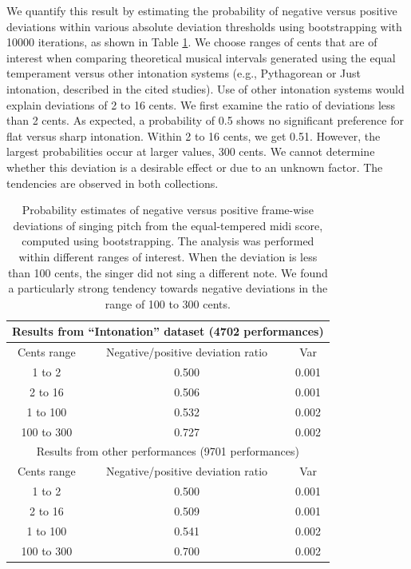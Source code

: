 We quantify this result by estimating the probability of negative versus positive deviations within various absolute deviation thresholds using bootstrapping \cite{efron1994introduction} with 10000 iterations, as shown in Table \ref{table:1}. We choose ranges of cents that are of interest when comparing theoretical musical intervals generated using the equal temperament versus other intonation systems (e.g., Pythagorean or Just intonation, described in the cited studies). Use of other intonation systems would explain deviations of 2 to 16 cents. We first examine the ratio of deviations less than 2 cents. As expected, a probability of 0.5 shows no significant preference for flat versus sharp intonation. Within 2 to 16 cents, we get 0.51. However, the largest probabilities occur at larger values, 300 cents. We cannot determine whether this deviation is a desirable effect or due to an unknown factor. The tendencies are observed in both collections. 


\begin{table}[t!]
\centering
\begin{tabular}{ |c|c|c| } 
\hline
\multicolumn{3}{|c|}{Results from ``Intonation'' dataset (4702 performances)}\\
\hline\hline
Cents range & Negative/positive deviation ratio & Var \\
\hline
1 to 2 & 0.500 & 0.001 \\ 
2 to 16 & 0.506 & 0.001 \\ 
1 to 100 & 0.532 & 0.002\\ 
100 to 300 & 0.727 & 0.002\\ 
\hline\hline
\multicolumn{3}{|c|}{Results from other performances (9701 performances)}\\
\hline\hline
Cents range & Negative/positive deviation ratio & Var \\
\hline
1 to 2 & 0.500 & 0.001 \\ 
2 to 16 & 0.509 & 0.001 \\ 
1 to 100 & 0.541 & 0.002\\ 
100 to 300 & 0.700 & 0.002\\ 
\hline
\end{tabular}
\caption{Probability estimates of negative versus positive frame-wise deviations of singing pitch from the equal-tempered \gls{midi} score, computed using bootstrapping. The analysis was performed within different ranges of interest. When the deviation is less than 100 cents, the singer did not sing a different note. We found a particularly strong tendency towards negative deviations in the range of 100 to 300 cents.}
\label{table:1}
\end{table}

